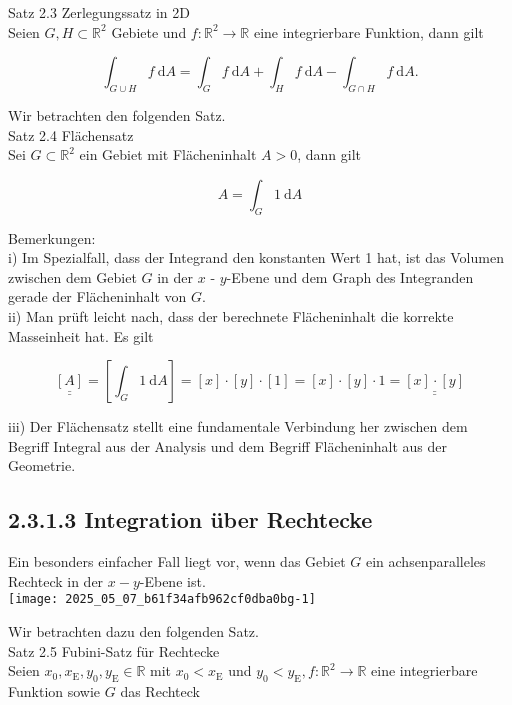 \documentclass[10pt]{article}
\begin{document}
Satz 2.3 Zerlegungssatz in 2D\\
Seien $G, H \subset \mathbb{R}^{2}$ Gebiete und $f: \mathbb{R}^{2} \rightarrow \mathbb{R}$ eine integrierbare Funktion, dann gilt


\begin{equation*}
\int_{G \cup H} f \mathrm{~d} A=\int_{G} f \mathrm{~d} A+\int_{H} f \mathrm{~d} A-\int_{G \cap H} f \mathrm{~d} A . \tag{2.72}
\end{equation*}


Wir betrachten den folgenden Satz.\\
Satz 2.4 Flächensatz\\
Sei $G \subset \mathbb{R}^{2}$ ein Gebiet mit Flächeninhalt $A>0$, dann gilt


\begin{equation*}
A=\int_{G} 1 \mathrm{~d} A \tag{2.73}
\end{equation*}


Bemerkungen:\\
i) Im Spezialfall, dass der Integrand den konstanten Wert 1 hat, ist das Volumen zwischen dem Gebiet $G$ in der $x$ - $y$-Ebene und dem Graph des Integranden gerade der Flächeninhalt von $G$.\\
ii) Man prüft leicht nach, dass der berechnete Flächeninhalt die korrekte Masseinheit hat. Es gilt


\begin{equation*}
\underline{\underline{[A]}}=\left[\int_{G} 1 \mathrm{~d} A\right]=[x] \cdot[y] \cdot[1]=[x] \cdot[y] \cdot 1=\underline{\underline{[x] \cdot[y]}} \tag{2.74}
\end{equation*}


iii) Der Flächensatz stellt eine fundamentale Verbindung her zwischen dem Begriff Integral aus der Analysis und dem Begriff Flächeninhalt aus der Geometrie.

\subsection*{2.3.1.3 Integration über Rechtecke}
Ein besonders einfacher Fall liegt vor, wenn das Gebiet $G$ ein achsenparalleles Rechteck in der $x-y$-Ebene ist.\\
\texttt{[image: 2025\_05\_07\_b61f34afb962cf0dba0bg-1]}

Wir betrachten dazu den folgenden Satz.\\
Satz 2.5 Fubini-Satz für Rechtecke\\
Seien $x_{0}, x_{\mathrm{E}}, y_{0}, y_{\mathrm{E}} \in \mathbb{R}$ mit $x_{0}<x_{\mathrm{E}}$ und $y_{0}<y_{\mathrm{E}}, f: \mathbb{R}^{2} \rightarrow \mathbb{R}$ eine integrierbare Funktion sowie $G$ das Rechteck
\end{document}

